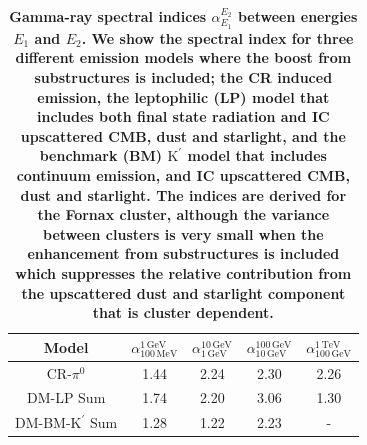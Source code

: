 \documentclass[10pt,aps,pra,reprint,amsmath,amsfonts,amssymb,showpacs,nofootinbib,floatfix]{revtex4-1}
\def\C#1{{\bf #1}}
\newcommand{\rmn}{\mathrm}
\newcommand{\Kp}{\rmn{K}^\prime}
\begin{document}
\begin{table}
\begin{tabular}{ccccc}
\hline\hline
      Model & $\alpha_{100\,\rmn{MeV}}^{1\,\rmn{GeV}}$  & 
              $\alpha_{1\,\rmn{GeV}}^{10\,\rmn{GeV}}$   & 
              $\alpha_{10\,\rmn{GeV}}^{100\,\rmn{GeV}}$ &
              $\alpha_{100\,\rmn{GeV}}^{1\,\rmn{TeV}}$  \\
\hline
CR-$\pi^0$      & 1.44 & 2.24 & 2.30 & 2.26 \\
DM-LP Sum       & 1.74 & 2.20 & 3.06 & 1.30 \\
DM-BM-$\Kp$ Sum  & 1.28 & 1.22 & 2.23 & -    \\
\hline\hline
\end{tabular}
 \caption{\C{Gamma-ray spectral indices $\alpha_{E_1}^{E_2}$ between
     energies $E_1$ and $E_2$. We show the spectral index for three
     different emission models where the boost from substructures is
     included; the CR induced emission, the leptophilic (LP) model
     that includes both final state radiation and IC upscattered CMB,
     dust and starlight, and the benchmark (BM) $\Kp$ model that
     includes continuum emission, and IC upscattered CMB, dust and
     starlight. The indices are derived for the Fornax cluster,
     although the variance between clusters is very small when the
     enhancement from substructures is included which suppresses the
     relative contribution from the upscattered dust and starlight
     component that is cluster dependent. \label{tab:spectral_index}}}
\end{table}
\end{document}

